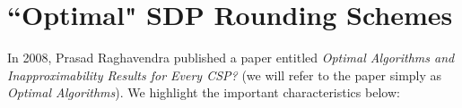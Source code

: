 %
%
%
%
%
\newpage
\section{``Optimal" SDP Rounding Schemes}\label{sec:optRoundSchemes}
In 2008, Prasad Raghavendra published a paper entitled \textit{Optimal Algorithms and Inapproximability Results for Every CSP?} (we will refer to the paper simply as \textit{Optimal Algorithms}). We highlight the important characteristics below:

